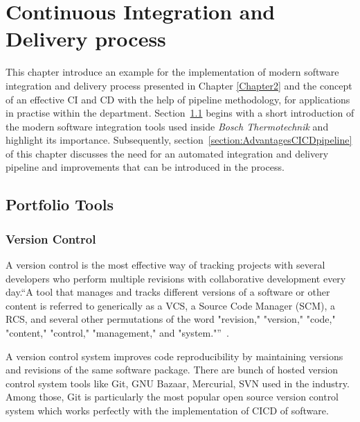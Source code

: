 
\chapter{Continuous Integration and Delivery process} %

\label{Chapter3} %

This chapter introduce an example for the implementation of modern software integration and delivery process presented in Chapter \ref{Chapter2} and the concept of an effective \ac{CI} and \ac{CD} with the help of pipeline methodology, for applications in practise within the department. Section~\ref{section:Integrationtools} begins with a short introduction of the modern software integration tools used inside \emph{Bosch Thermotechnik} and highlight its importance. Subsequently, section~\ref{section:AdvantagesCICDpipeline} of this chapter discusses the need for an automated integration and delivery pipeline and improvements that can be introduced in the process.


\section{Portfolio Tools} \label{section:Integrationtools}

\subsection{Version Control}

A version control is the most effective way of tracking projects with several developers who perform multiple revisions with collaborative development every day.\enquote{A tool that manages and tracks different versions of a software or other content is referred to generically as a \ac{VCS}, a Source Code Manager (SCM), a \ac{RCS}, and several other permutations of the word "revision," "version," "code," "content," "control," "management," and "system."}~\parencite{loeliger2012version}.

A version control system improves code reproducibility by maintaining versions and revisions of the same software package. There are bunch of hosted version control system tools like Git, GNU Bazaar, Mercurial, SVN used in the industry. Among those, Git is particularly the most popular open source version control system which works perfectly with the implementation of CICD of software. 

